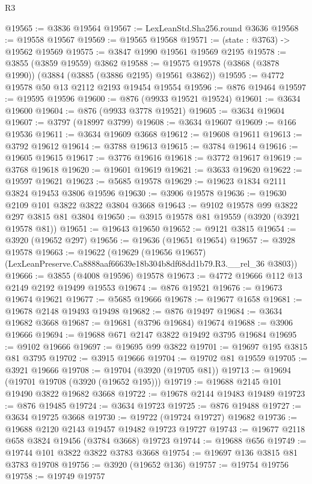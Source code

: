 \begin{lexlean}{R3}
\begin{coremodule}
@19565 := @3836 @19564
@19567 := LexLeanStd.Sha256.round @3636
@19568 := @19558 @19567
@19569 := @19565 @19568
@19571 := (state : @3763) -> @19562 @19569
@19575 := @3847 @1990 @19561 @19569 @2195
@19578 := @3855 (@3859 @19559) @3862
@19588 := @19575 @19578 (@3868 (@3878 @1990)) (@3884 (@3885 (@3886 @2195) @19561 @3862))
@19595 := @4772 @19578 @50 @13 @2112 @2193 @19454 @19554
@19596 := @876 @19464
@19597 := @19595 @19596
@19600 := @876 (@9933 @19521 @19524)
@19601 := @3634 @19600
@19604 := @876 (@9933 @3778 @19521)
@19605 := @3634 @19604
@19607 := @3797 (@18997 @3799)
@19608 := @3634 @19607
@19609 := @166 @19536
@19611 := @3634 @19609 @3668
@19612 := @19608 @19611
@19613 := @3792 @19612
@19614 := @3788 @19613
@19615 := @3784 @19614
@19616 := @19605 @19615
@19617 := @3776 @19616
@19618 := @3772 @19617
@19619 := @3768 @19618
@19620 := @19601 @19619
@19621 := @3633 @19620
@19622 := @19597 @19621
@19623 := @5685 @19578
@19629 := @19623 @1834 @2111 @3824 @19453 @3806 @19596
@19630 := @3906 @19578
@19636 := @19630 @2109 @101 @3822 @3822 @3804 @3668
@19643 := @9102 @19578 @99 @3822 @297 @3815 @81 @3804
@19650 := @3915 @19578 @81 @19559 (@3920 (@3921 @19578 @81))
@19651 := @19643 @19650
@19652 := @9121 @3815
@19654 := @3920 (@19652 @297)
@19656 := @19636 (@19651 @19654)
@19657 := @3928 @19578
@19663 := @19622
    (@19629 (@19656 @19657) (LexLeanPreserve.Ca8888aaf66639e18b304b8df68dd1b79.R3.__rel_36 @3803))
@19666 := @3855 (@4008 @19596) @19578
@19673 := @4772 @19666 @112 @13 @2149 @2192 @19499 @19553
@19674 := @876 @19521
@19676 := @19673 @19674 @19621
@19677 := @5685 @19666
@19678 := @19677 @1658
@19681 := @19678 @2148 @19493 @19498
@19682 := @876 @19497
@19684 := @3634 @19682 @3668
@19687 := @19681 (@3796 @19684) @19674
@19688 := @3906 @19666
@19694 := @19688 @671 @2147 @3822 @19492 @3795 @19684
@19695 := @9102 @19666
@19697 := @19695 @99 @3822
@19701 := @19697 @195 @3815 @81 @3795
@19702 := @3915 @19666
@19704 := @19702 @81 @19559
@19705 := @3921 @19666
@19708 := @19704 (@3920 (@19705 @81))
@19713 := @19694 (@19701 @19708 (@3920 (@19652 @195)))
@19719 := @19688 @2145 @101 @19490 @3822 @19682 @3668
@19722 := @19678 @2144 @19483 @19489
@19723 := @876 @19485
@19724 := @3634 @19723
@19725 := @876 @19488
@19727 := @3634 @19725 @3668
@19730 := @19722 (@19724 @19727) @19682
@19736 := @19688 @2120 @2143 @19457 @19482 @19723 @19727
@19743 := @19677 @2118 @658 @3824 @19456 (@3784 @3668) @19723
@19744 := @19688 @656
@19749 := @19744 @101 @3822 @3822 @3783 @3668
@19754 := @19697 @136 @3815 @81 @3783 @19708
@19756 := @3920 (@19652 @136)
@19757 := @19754 @19756
@19758 := @19749 @19757

\end{coremodule}
\end{lexlean}

